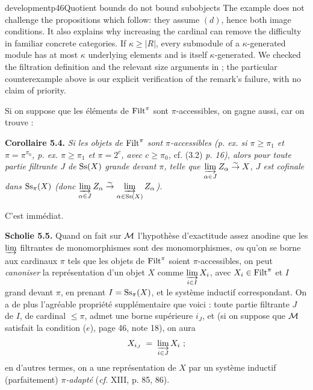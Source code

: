 \begin{dcomment}{development}{p46}{Quotient bounds do not bound subobjects}
The example does not challenge the propositions which follow: they assume $(d)$, hence both image conditions. It also explains why increasing the cardinal can remove the difficulty in familiar concrete categories. If $\kappa\geq|R|$, every submodule of a $\kappa$-generated module has at most $\kappa$ underlying elements and is itself $\kappa$-generated. We checked the filtration definition and the relevant size arguments in \citep[Expos\'e~I, 9.12--9.16]{SGA4I1972}; the particular counterexample above is our explicit verification of the remark's failure, with no claim of priority.
\end{dcomment}



Si on suppose que les éléments de $\mathrm{Filt}^{\pi}$ sont $\pi$-accessibles, on gagne aussi, car on trouve :

\textbf{Corollaire 5.4.} \textit{Si les objets de} $\mathrm{Filt}^{\pi}$ \textit{sont $\pi$-accessibles (p. ex. si $\pi \geq \pi_1$ et $\pi = \pi^{\pi_0}$, p. ex. $\pi \geq \pi_1$ et $\pi = 2^{c}$, avec $c \geq \pi_0$,} cf. (3.2) \textit{p. 16), alors pour toute partie filtrante $J$ de} $\mathrm{Ss}(X)$ \textit{grande devant $\pi$, telle que $\varinjlim\limits_{\alpha\in J} Z_{\alpha} \overset{\sim}{\to} X$, $J$ est cofinale dans} $\mathrm{Ss}_{\pi}(X)$ \textit{(donc $\varinjlim\limits_{\alpha\in J} Z_{\alpha} \overset{\sim}{\to} \varinjlim\limits_{\alpha\in\mathrm{Ss}(X)} Z_{\alpha}$).}

C'est immédiat.

\textbf{Scholie 5.5.} Quand on fait sur $\mathcal{M}$ l'hypothèse d'exactitude assez anodine que les $\varinjlim$ filtrantes de monomorphismes sont des monomorphismes, \textit{ou} qu'on se borne aux cardinaux $\pi$ tels que les objets de $\mathrm{Filt}^{\pi}$ soient $\pi$-accessibles, on peut \textit{canoniser} la représentation d'un objet $X$ comme $\varinjlim\limits_{i\in I} X_i$, avec $X_i \in \mathrm{Filt}^{\pi}$ et $I$ grand devant $\pi$, en prenant $I = \mathrm{Ss}_{\pi}(X)$, et le système inductif correspondant. On a de plus l'agréable propriété supplémentaire que voici : toute partie filtrante $J$ de $I$, de cardinal $\leq \pi$, admet une borne supérieure $i_J$, et (si on suppose que $\mathcal{M}$ satisfait la condition ($e$), page 46, note 18), on aura
\[
X_{i_J} \;=\; \varinjlim_{i\in J} X_i \ ;
\]
en d'autres termes, on a une représentation de $X$ par un système inductif (parfaitement) \textit{$\pi$-adapté} (\textit{cf.} XIII, p. 85, 86).

